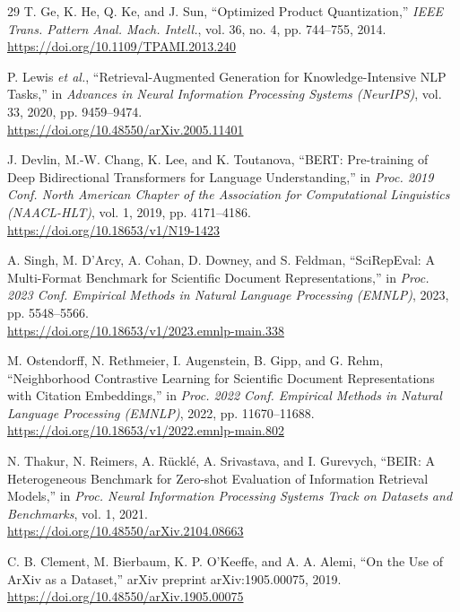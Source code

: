 \documentclass[runningheads]{llncs}
\begin{document}
\begin{thebibliography}{29}
T. Ge, K. He, Q. Ke, and J. Sun, ``Optimized Product Quantization,'' \textit{IEEE Trans.
Pattern Anal. Mach. Intell.}, vol. 36, no. 4, pp. 744--755, 2014.\\
\url{https://doi.org/10.1109/TPAMI.2013.240}

P. Lewis \textit{et al.}, ``Retrieval-Augmented Generation for Knowledge-Intensive
NLP Tasks,'' in \textit{Advances in Neural Information Processing Systems
(NeurIPS)}, vol. 33, 2020, pp. 9459--9474.\\
\url{https://doi.org/10.48550/arXiv.2005.11401}

J. Devlin, M.-W. Chang, K. Lee, and K. Toutanova, ``BERT: Pre-training of Deep
Bidirectional Transformers for Language Understanding,'' in \textit{Proc. 2019 Conf. North
American Chapter of the Association for Computational Linguistics (NAACL-HLT)}, vol. 1,
2019, pp. 4171--4186.\\
\url{https://doi.org/10.18653/v1/N19-1423}

A. Singh, M. D'Arcy, A. Cohan, D. Downey, and S. Feldman, ``SciRepEval: A Multi-Format
Benchmark for Scientific Document Representations,'' in \textit{Proc. 2023 Conf. Empirical
Methods in Natural Language Processing (EMNLP)}, 2023, pp. 5548--5566.\\
\url{https://doi.org/10.18653/v1/2023.emnlp-main.338}

M. Ostendorff, N. Rethmeier, I. Augenstein, B. Gipp, and G. Rehm, ``Neighborhood
Contrastive Learning for Scientific Document Representations with Citation Embeddings,'' in
\textit{Proc. 2022 Conf. Empirical Methods in Natural Language Processing (EMNLP)}, 2022,
pp. 11670--11688.\\
\url{https://doi.org/10.18653/v1/2022.emnlp-main.802}

N. Thakur, N. Reimers, A. R\"uckl\'e, A. Srivastava, and I. Gurevych, ``BEIR: A
Heterogeneous Benchmark for Zero-shot Evaluation of Information Retrieval Models,'' in
\textit{Proc. Neural Information Processing Systems Track on Datasets and Benchmarks},
vol. 1, 2021.\\
\url{https://doi.org/10.48550/arXiv.2104.08663}

C. B. Clement, M. Bierbaum, K. P. O'Keeffe, and A. A. Alemi, ``On the Use of ArXiv
as a Dataset,'' arXiv preprint arXiv:1905.00075, 2019.\\
\url{https://doi.org/10.48550/arXiv.1905.00075}


\end{thebibliography}
\end{document}
